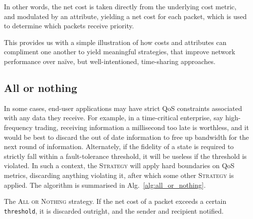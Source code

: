 \documentclass[aps, rmp, twocolumn, amsmath, amssymb, nofootinbib, superscriptaddress, longbibliography, floatfix, table-of-contents, eqsecnum]{revtex4-1}
\begin{document}
In other words, the net cost is taken directly from the underlying cost metric, and modulated by an attribute, yielding a net cost for each packet, which is used to determine which packets receive priority.

This provides us with a simple illustration of how costs and attributes can compliment one another to yield meaningful strategies, that improve network performance over na\"ive, but well-intentioned, time-sharing approaches.

%
%

\subsection{All or nothing} \label{sec:all_or_nothing} 

In some cases, end-user applications may have strict QoS constraints associated with any data they receive. For example, in a time-critical enterprise, say high-frequency trading, receiving information a millisecond too late is worthless, and it would be best to discard the out of date information to free up bandwidth for the next round of information. Alternately, if the fidelity of a state is required to strictly fall within a fault-tolerance threshold, it will be useless if the threshold is violated. In such a context, the \textsc{Strategy} will apply hard boundaries on QoS metrics, discarding anything violating it, after which some other \textsc{Strategy} is applied. The algorithm is summarised in Alg.~\ref{alg:all_or_nothing}.

\begin{table}[!htb]
\caption{The \textsc{All or Nothing} strategy. If the net cost of a packet exceeds a certain \texttt{threshold}, it is discarded outright, and the sender and recipient notified.} \label{alg:all_or_nothing}
\end{table}
\end{document}
